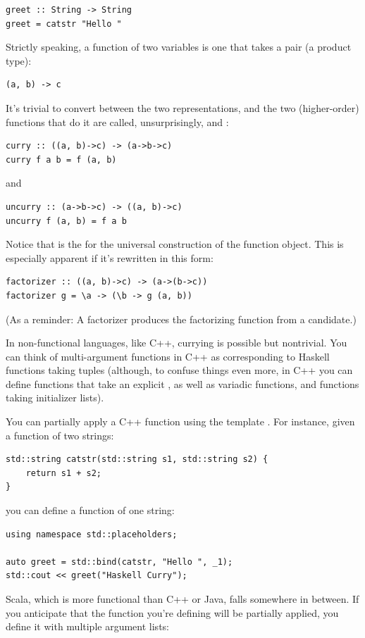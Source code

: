 \begin{Verbatim}
greet :: String -> String
greet = catstr "Hello "
\end{Verbatim}
Strictly speaking, a function of two variables is one that takes a pair
(a product type):

\begin{Verbatim}
(a, b) -> c
\end{Verbatim}
It's trivial to convert between the two representations, and the two
(higher-order) functions that do it are called, unsurprisingly,
 and :

\begin{Verbatim}
curry :: ((a, b)->c) -> (a->b->c)
curry f a b = f (a, b)
\end{Verbatim}
and

\begin{Verbatim}
uncurry :: (a->b->c) -> ((a, b)->c)
uncurry f (a, b) = f a b
\end{Verbatim}
Notice that  is the  for the universal
construction of the function object. This is especially apparent if it's
rewritten in this form:

\begin{Verbatim}
factorizer :: ((a, b)->c) -> (a->(b->c))
factorizer g = \a -> (\b -> g (a, b))
\end{Verbatim}
(As a reminder: A factorizer produces the factorizing function from a
candidate.)

In non-functional languages, like C++, currying is possible but
nontrivial. You can think of multi-argument functions in C++ as
corresponding to Haskell functions taking tuples (although, to confuse
things even more, in C++ you can define functions that take an explicit
, as well as variadic functions, and functions taking
initializer lists).

You can partially apply a C++ function using the template
. For instance, given a function of two strings:

\begin{Verbatim}
std::string catstr(std::string s1, std::string s2) {
    return s1 + s2;
}
\end{Verbatim}
you can define a function of one string:

\begin{Verbatim}
using namespace std::placeholders;

auto greet = std::bind(catstr, "Hello ", _1);
std::cout << greet("Haskell Curry");
\end{Verbatim}
Scala, which is more functional than C++ or Java, falls somewhere in
between. If you anticipate that the function you're defining will be
partially applied, you define it with multiple argument lists:

